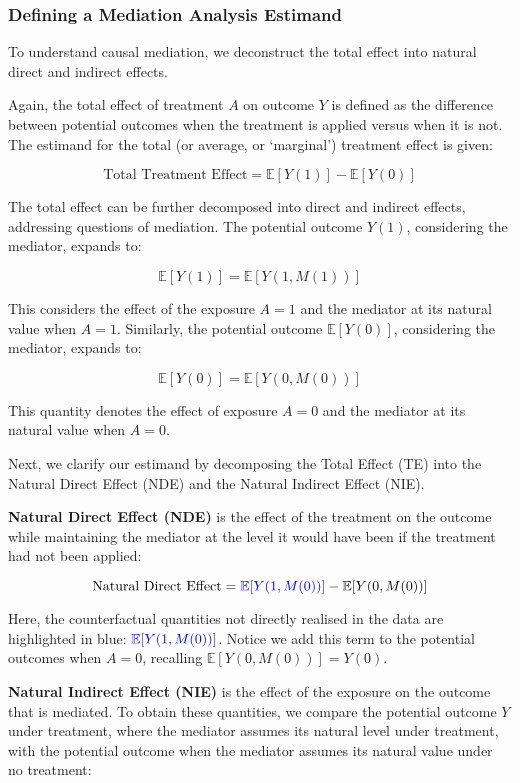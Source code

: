\documentclass[
  single column]{article}
\begin{document}
\subsubsection{Defining a Mediation Analysis
Estimand}\label{defining-a-mediation-analysis-estimand}

To understand causal mediation, we deconstruct the total effect into
natural direct and indirect effects.

Again, the total effect of treatment \(A\) on outcome \(Y\) is defined
as the difference between potential outcomes when the treatment is
applied versus when it is not. The estimand for the total (or average,
or `marginal') treatment effect is given:

\[
\text{Total Treatment Effect} = \mathbb{E}[Y(1)] - \mathbb{E}[Y(0)]
\]

The total effect can be further decomposed into direct and indirect
effects, addressing questions of mediation. The potential outcome
\(Y(1)\), considering the mediator, expands to:

\[ 
\mathbb{E}[Y(1)] = \mathbb{E}[Y(1, M(1))]
\]

This considers the effect of the exposure \(A = 1\) and the mediator at
its natural value when \(A = 1\). Similarly, the potential outcome
\(\mathbb{E}[Y(0)]\), considering the mediator, expands to:

\[ 
\mathbb{E}[Y(0)] = \mathbb{E}[Y(0, M(0))]
\]

This quantity denotes the effect of exposure \(A = 0\) and the mediator
at its natural value when \(A = 0\).

Next, we clarify our estimand by decomposing the Total Effect (TE) into
the Natural Direct Effect (NDE) and the Natural Indirect Effect (NIE).

\textbf{Natural Direct Effect (NDE)} is the effect of the treatment on
the outcome while maintaining the mediator at the level it would have
been if the treatment had not been applied:

\[
\text{Natural Direct Effect} = \textcolor{blue}{\mathbb{E}[Y(1, M(0))]} - \mathbb{E}[Y(0, M(0))]
\]

Here, the counterfactual quantities not directly realised in the data
are highlighted in blue: \(\textcolor{blue}{\mathbb{E}[Y(1, M(0))]}\).
Notice we add this term to the potential outcomes when \(A = 0\),
recalling \(\mathbb{E}[Y(0, M(0))] = Y(0)\).

\textbf{Natural Indirect Effect (NIE)} is the effect of the exposure on
the outcome that is mediated. To obtain these quantities, we compare the
potential outcome \(Y\) under treatment, where the mediator assumes its
natural level under treatment, with the potential outcome when the
mediator assumes its natural value under no treatment:
\end{document}

